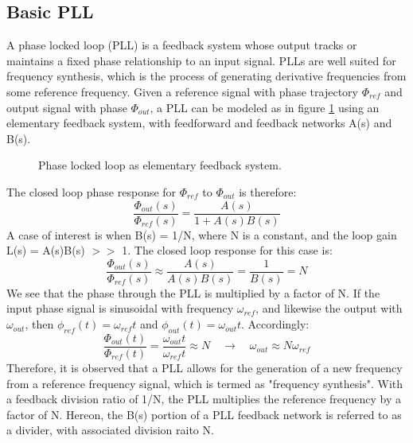 	\subsection{Basic PLL}
	A phase locked loop (PLL) is a feedback system whose output tracks or maintains a fixed phase relationship to an input signal. PLLs are well suited for frequency synthesis, which is the process of generating derivative frequencies from some reference frequency. Given a reference signal with phase trajectory $\Phi_{ref}$ and output signal with phase $\Phi_{out}$, a PLL can be modeled as in figure \ref{fig:basic_fb} using an elementary feedback system, with feedforward and feedback networks A(s) and B(s). 
	\begin{figure}[htb!]
		\center
		\caption{Phase locked loop as elementary feedback system.}
		\label{fig:basic_fb}
	\end{figure}
	\FloatBarrier
	The closed loop phase response for $\Phi_{ref}$ to $\Phi_{out}$ is therefore:
	\begin{equation}
		\frac{\Phi_{out}(s)}{\Phi_{ref}(s)} = \frac{A(s)}{1+A(s)B(s)}
	\end{equation}
	A case of interest is when B(s) = 1/N, where N is a constant, and the loop gain L(s) = A(s)B(s) $>>$ 1. The closed loop response for this case is:
	\begin{equation}\label{mult_by_n}
		\frac{\Phi_{out}(s)}{\Phi_{ref}(s)} \approx \frac{A(s)}{A(s)B(s)} = \frac{1}{B(s)} = N
	\end{equation}
	We see that the phase through the PLL is multiplied by a factor of N. If the input phase signal is sinusoidal with frequency $\omega_{ref}$, and likewise the output with $\omega_{out}$, then $\phi_{ref}(t)=\omega_{ref}t$ and $\phi_{out}(t)=\omega_{out}t$. Accordingly:
	\begin{equation}
		\frac{\Phi_{out}(t)}{\Phi_{ref}(t)} = \frac{\omega_{out}t}{\omega_{ref}t} \approx N \hspace{1em} \rightarrow \hspace{1em} \omega_{out} \approx N\omega_{ref}
	\end{equation}
	Therefore, it is observed that a PLL allows for the generation of a new frequency from a reference frequency signal, which is termed as "frequency synthesis". With a feedback division ratio of 1/N, the PLL multiplies the reference frequency by a factor of N. Hereon, the B(s) portion of a PLL feedback network is referred to as a divider, with associated division raito N.

